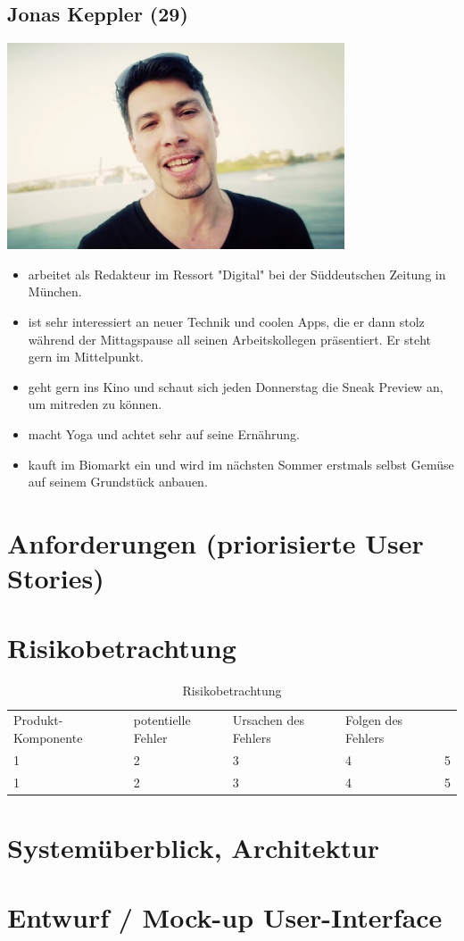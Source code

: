\documentclass[10pt, a4paper, oneside, titlepage]{scrartcl} %
\begin{document}
	\subsection{Jonas Keppler (29)}
	\begin{center}
		\includegraphics[width=10.0cm]{persona_03.jpg}
	\end{center}
	\begin{itemize}
		\item{}arbeitet als Redakteur im Ressort "Digital" bei der Süddeutschen Zeitung in München.
		\item{}ist sehr interessiert an neuer Technik und coolen Apps, die er dann stolz während der Mittagspause all seinen Arbeitskollegen präsentiert. Er 				steht gern im Mittelpunkt.
		\item{}geht gern ins Kino und schaut sich jeden Donnerstag die Sneak Preview an, um mitreden zu können.
		\item{}macht Yoga und achtet sehr auf seine Ernährung.
		\item{}kauft im Biomarkt ein und wird im nächsten Sommer erstmals selbst Gemüse auf seinem Grundstück anbauen.
	\end{itemize}
	
   	\section{Anforderungen (priorisierte User Stories)}
   	\section{Risikobetrachtung}
   
	\begin{table}[h!tp]
		\begin{center}
			\begin{tabular}{lllll}
				\rowcolor[rgb]{0.6, 0.6, 0.6}
				Produkt-Komponente & potentielle Fehler & Ursachen des Fehlers & Folgen des Fehlers \\
				1 & 2 & 3 & 4 & 5 \\
				\rowcolor[rgb]{0.8, 0.8, 0.8}
				1 & 2 & 3 & 4 & 5 \\
				\hline
			\end{tabular}
		\end{center}
		\caption{Risikobetrachtung}
	\label{risikobetrachtung}
	\end{table}
   
   \section{Systemüberblick, Architektur}
   \section{Entwurf / Mock-up User-Interface}

\label{letzte_seite} %
\end{document}

